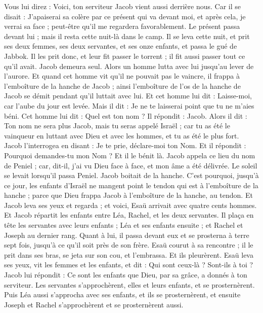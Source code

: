 \begin{multicols}{2}
Vous lui direz : Voici, ton serviteur Jacob vient aussi derrière nous. Car il se disait : J'apaiserai sa colère par ce présent qui va devant moi, et après cela, je verrai sa face ; peut-être qu'il me regardera favorablement.
Le présent passa devant lui ; mais il resta cette nuit-là dans le camp.
Il se leva cette nuit, et prit ses deux femmes, ses deux servantes, et ses onze enfants, et passa le gué de Jabbok.
Il les prit donc, et leur fit passer le torrent ; il fit aussi passer tout ce qu'il avait.
Jacob demeura seul. Alors un homme lutta avec lui jusqu'au lever de l'aurore.
Et quand cet homme vit qu'il ne pouvait pas le vaincre, il frappa à l'emboîture de la hanche de Jacob ; ainsi l'emboîture de l'os de la hanche de Jacob se démit pendant qu'il luttait avec lui.
Et cet homme lui dit : Laisse-moi, car l'aube du jour est levée. Mais il dit : Je ne te laisserai point que tu ne m'aies béni.
Cet homme lui dit : Quel est ton nom ? Il répondit : Jacob.
Alors il dit : Ton nom ne sera plus Jacob, mais tu seras appelé Israël ; car tu as été le vainqueur en luttant avec Dieu et avec les hommes, et tu as été le plus fort.
Jacob l'interrogea en disant : Je te prie, déclare-moi ton Nom. Et il répondit : Pourquoi demandes-tu mon Nom ? Et il le bénit là.
Jacob appela ce lieu du nom de Peniel ; car, dit-il, j'ai vu Dieu face à face, et mon âme a été délivrée.
Le soleil se levait lorsqu'il passa Peniel. Jacob boitait de la hanche.
C'est pourquoi, jusqu'à ce jour, les enfants d'Israël ne mangent point le tendon qui est à l'emboîture de la hanche ; parce que Dieu frappa Jacob à l'emboîture de la hanche, au tendon.
\VerseOne{}Et Jacob leva ses yeux et regarda ; et voici, Esaü arrivait avec quatre cents hommes. Et Jacob répartit les enfants entre Léa, Rachel, et les deux servantes.
Il plaça en tête les servantes avec leurs enfants ; Léa et ses enfants ensuite ; et Rachel et Joseph au dernier rang.
Quant à lui, il passa devant eux et se prosterna à terre sept fois, jusqu'à ce qu'il soit près de son frère.
Esaü courut à sa rencontre ; il le prit dans ses bras, se jeta sur son cou, et l'embrassa. Et ils pleurèrent.
Esaü leva ses yeux, vit les femmes et les enfants, et dit : Qui sont ceux-là ? Sont-ils à toi ? Jacob lui répondit : Ce sont les enfants que Dieu, par sa grâce, a donnés à ton serviteur.
Les servantes s'approchèrent, elles et leurs enfants, et se prosternèrent.
Puis Léa aussi s'approcha avec ses enfants, et ils se prosternèrent, et ensuite Joseph et Rachel s'approchèrent et se prosternèrent aussi.

\end{multicols}

